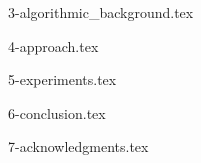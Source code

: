 \documentclass[letterpaper]{article} %
\begin{document}
{3-algorithmic_background.tex}

{4-approach.tex}

{5-experiments.tex}

{6-conclusion.tex}

{7-acknowledgments.tex}













\end{document}
